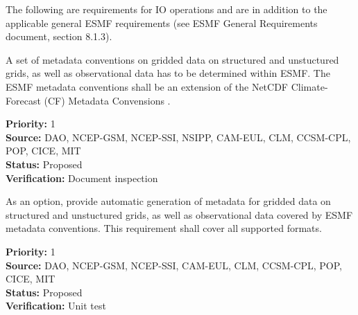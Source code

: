 

The following are requirements for IO operations and are in addition
to the applicable general ESMF requirements (see ESMF General 
Requirements document, section 8.1.3).



A set of metadata conventions on gridded data on structured and
unstuctured grids, as well as observational data has to be determined
within ESMF. The ESMF metadata conventions shall be an extension of the NetCDF 
Climate-Forecast (CF) Metadata Convensions \cite{NetCDF_CF_v1_beta3}.

\begin{reqlist}
{\bf Priority:} 1 \\
{\bf Source:} DAO, NCEP-GSM, NCEP-SSI, NSIPP, CAM-EUL, CLM, CCSM-CPL, POP, CICE, MIT \\
{\bf Status:} Proposed \\
{\bf Verification:} Document inspection \\
\end{reqlist}


As an option, provide automatic generation of metadata for gridded
data on structured and unstuctured grids, as well as observational
data covered by ESMF metadata conventions. This requirement shall
cover all supported formats.

\begin{reqlist}
{\bf Priority:} 1 \\
{\bf Source:} DAO, NCEP-GSM, NCEP-SSI, CAM-EUL, CLM, CCSM-CPL, POP, CICE, MIT \\
{\bf Status:} Proposed \\
{\bf Verification:} Unit test \\
\end{reqlist}



